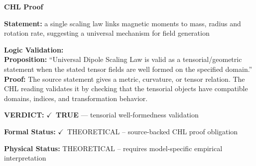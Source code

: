 \vspace{0.45em}
\noindent\textbf{CHL Proof}\par
\textbf{Statement:} a single scaling law links magnetic moments to mass, radius and rotation rate,
suggesting a universal mechanism for field generation

\textbf{Logic Validation:}\\
\textbf{Proposition:} ``Universal Dipole Scaling Law is valid as a tensorial/geometric statement when the stated
tensor fields are well formed on the specified domain.''\\
\textbf{Proof:} The source statement gives a metric, curvature, or tensor relation. The CHL reading
validates it by checking that the tensorial objects have compatible domains, indices,
and transformation behavior.

\textbf{VERDICT:} \ensuremath{\checkmark}\ \textbf{TRUE} --- tensorial well-formedness validation

\textbf{Formal Status:} \ensuremath{\checkmark}\ THEORETICAL -- source-backed CHL proof obligation

\textbf{Physical Status:} THEORETICAL -- requires model-specific empirical interpretation
\par\vspace{0.45em}
\par
\ifTZPDarkEdition
{}
\fi
\endgroup
\endgroup
